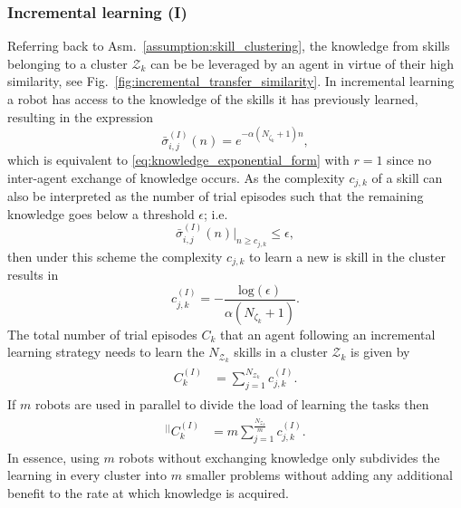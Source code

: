 \subsubsection{\textbf{Incremental learning (I)}}
Referring back to Asm.~\ref{assumption:skill_clustering}, the knowledge from skills belonging to a cluster ${\mathcal{Z}_k}$ can be be leveraged by an agent in virtue of their high similarity, see Fig.~\ref{fig:incremental_transfer_similarity}. In incremental learning a robot has access to the knowledge of the skills it has previously learned, resulting in the expression
\begin{equation*}\label{eq:complexity_IL}
	\bar{\sigma}^{(I)}_{i,j}(n) = e^{-\alpha \left(N_{\zeta_k}+1\right) n},
\end{equation*}
which is equivalent to \eqref{eq:knowledge_exponential_form} with $r=1$ since no inter-agent exchange of knowledge occurs. As the complexity $c_{j,k}$ of a skill can also be interpreted as the number of trial episodes such that the remaining knowledge goes below a threshold $\epsilon$; i.e.
\begin{equation*}
	\bar{\sigma}^{(I)}_{i,j}(n) \rvert_{n \ge c_{j,k}} \leq \epsilon,
\end{equation*}
then under this scheme the complexity $c_{j,k}$ to learn a new is skill in the cluster results in
\begin{equation}\label{eq:complexity_IL}
	c^{(I)}_{j,k} = -\frac{\text{log}(\epsilon)}{\alpha (N_{\zeta_k}+ 1)}.
\end{equation}
The total number of trial episodes $ C_k $ that an agent following an incremental learning strategy needs to learn the $N_{\mathcal{Z}_k}$ skills in a cluster $ \mathcal{Z}_k $ is given by
\begin{align}\label{eq:total_episodes_incremental}
	\begin{split}
		C^{(I)}_k &= \sum^{N_{\mathcal{Z}_k}}_{j=1} c^{(I)}_{j,k}.
	\end{split}
\end{align}
If $m$ robots are used in parallel to divide the load of learning the tasks then
\begin{align}
	\begin{split}
		{}^{\lvert \rvert}C^{(I)}_k &= m\sum^{\frac{N_{\mathcal{Z}_k}}{m}}_{j=1} c^{(I)}_{j,k}.
	\end{split}
\end{align}
In essence, using $m$ robots without exchanging knowledge only subdivides the learning in every cluster into $m$ smaller problems without adding any additional benefit to the rate at which knowledge is acquired. 

